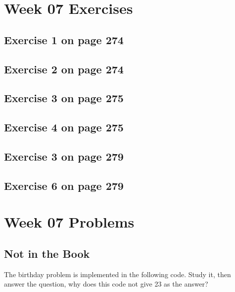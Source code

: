 \documentclass[12pt]{amsart}
\begin{document}

 \section{Week 07 Exercises}
\subsection{ Exercise 1 on page 274} 
\subsection{ Exercise 2 on page 274} 
\subsection{Exercise 3 on page 275} 
\subsection{Exercise 4 on page 275} 
\subsection{Exercise 3 on page 279} 
\subsection{Exercise 6 on page 279}


\section{Week 07 Problems}
\subsection{Not in the Book}
The birthday problem is implemented in the following code. Study it, then
  answer the question, why does this code not give 23 as the answer?

\end{document}
